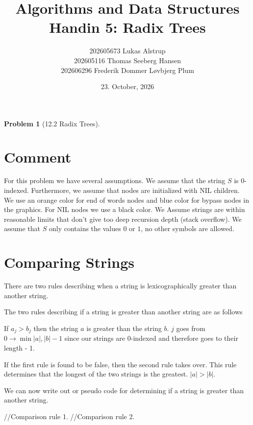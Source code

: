 \documentclass{article}
\title{Algorithms and Data Structures \\
  Handin 5: Radix Trees}
\author{
    202605673 Lukas Alstrup \\
    202605116 Thomas Seeberg Hansen \\
    202606296 Frederik Dommer Løvbjerg Plum
}
\date{23. October, 2026}  %
\newtheorem*{problem}{Problem}
\begin{document}
\maketitle
\begin{problem}[12.2 Radix Trees]
\end{problem}

\section*{Comment}
For this problem we have several assumptions. We assume that the string $S$ is 0-indexed. Furthermore, we assume that nodes are initialized with NIL children.
We use an orange color for end of words nodes and blue color for bypass nodes in the graphics. For NIL nodes we use a black color.
We Assume strings are within reasonable limits that don't give too deep recursion depth (stack overflow). We assume that $S$ only contains the values $0$ or $1$, no other symbols are allowed.

\section*{Comparing Strings}
There are two rules describing when a string is lexicographically greater than another string.

The two rules describing if a string is greater than another string are as follows

If $a_j > b_j$ then the string $a$ is greater than the string $b$. $j$ goes from $0 \rightarrow \min{|a|, |b|}-1$ since our strings are $0$-indexed and therefore goes to their length - 1.

If the first rule is found to be false, then the second rule takes over. This rule determines that the longest of the two strings is the greatest. $|a| > |b|$.

We can now write out or pseudo code for determining if a string is greater than another string.
\begin{center}
	\begin{minipage}{12cm}
		\begin{algorithmic}

			//Comparison rule 1.
			\EndIf
			\EndFor
			//Comparison rule 2.
			\EndIf

			\EndProcedure
		\end{algorithmic}
	\end{minipage}
\end{center}
\end{document}
